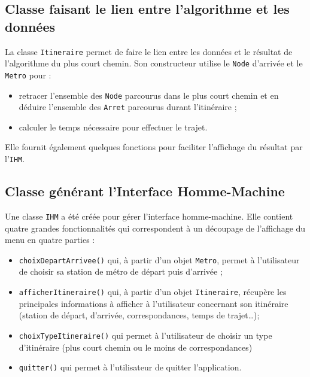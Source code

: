 \documentclass[,french]{article}
\begin{document}
\hypertarget{classe-faisant-le-lien-entre-lalgorithme-et-les-donnuxe9es}{%
\subsection{Classe faisant le lien entre l'algorithme et les
données}\label{classe-faisant-le-lien-entre-lalgorithme-et-les-donnuxe9es}}

La classe \texttt{Itineraire} permet de faire le lien entre les données
et le résultat de l'algorithme du plus court chemin. Son constructeur
utilise le \texttt{Node} d'arrivée et le \texttt{Metro} pour :

\begin{itemize}
\item
  retracer l'ensemble des \texttt{Node} parcourus dans le plus court
  chemin et en déduire l'ensemble des \texttt{Arret} parcourus durant
  l'itinéraire ;
\item
  calculer le temps nécessaire pour effectuer le trajet.
\end{itemize}

Elle fournit également quelques fonctions pour faciliter l'affichage du
résultat par l'\texttt{IHM}.

\hypertarget{classe-guxe9nuxe9rant-linterface-homme-machine}{%
\subsection{Classe générant l'Interface
Homme-Machine}\label{classe-guxe9nuxe9rant-linterface-homme-machine}}

Une classe \texttt{IHM} a été créée pour gérer l'interface
homme-machine. Elle contient quatre grandes fonctionnalités qui
correspondent à un découpage de l'affichage du menu en quatre parties :

\begin{itemize}
\item
  \texttt{choixDepartArrivee()} qui, à partir d'un objet \texttt{Metro},
  permet à l'utilisateur de choisir sa station de métro de départ puis
  d'arrivée ;
\item
  \texttt{afficherItineraire()} qui, à partir d'un objet
  \texttt{Itineraire}, récupère les principales informations à afficher
  à l'utilisateur concernant son itinéraire (station de départ,
  d'arrivée, correspondances, temps de trajet\ldots{});
\item
  \texttt{choixTypeItineraire()} qui permet à l'utilisateur de choisir
  un type d'itinéraire (plus court chemin ou le moins de
  correspondances)
\item
  \texttt{quitter()} qui permet à l'utilisateur de quitter
  l'application.
\end{itemize}
\end{document}
